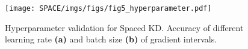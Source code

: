 \begin{figure} [h]
    \centering
    \texttt{[image: SPACE/imgs/figs/fig5\_hyperparameter.pdf]}
    \caption{Hyperparameter validation for Spaced KD. Accuracy of different learning rate \textbf{(a)} and batch size \textbf{(b)} of gradient intervals. %
    }
    \label{fig:hyperparameter}
\end{figure}